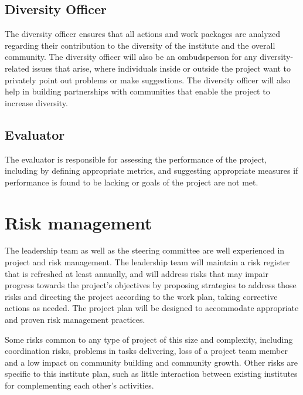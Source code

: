 \documentclass[
]{book}
\begin{document}
\hypertarget{diversity-officer}{%
\subsection{Diversity Officer}\label{diversity-officer}}

The diversity officer ensures that all actions and work packages are analyzed regarding their
contribution to the diversity of the institute and the overall community. The diversity officer will
also be an ombudsperson for any diversity-related issues that arise, where individuals inside or outside
the project want to privately point out problems or make suggestions. The diversity officer will also
help in building partnerships with communities that enable the project to increase diversity.

\hypertarget{evaluator}{%
\subsection{Evaluator}\label{evaluator}}

The evaluator is responsible for assessing the performance of the project, including by defining appropriate
metrics, and suggesting appropriate measures if performance is found to be lacking or goals of the project
are not met.

\hypertarget{risk-management}{%
\section{Risk management}\label{risk-management}}

The leadership team as well as the steering committee are well experienced in project and risk management.
The leadership team will maintain a risk register that is refreshed at least annually, and will address
risks that may impair progress towards the project's objectives by proposing strategies to address those
risks and directing the project according to the work plan, taking corrective actions as needed. The
project plan will be designed to accommodate appropriate and proven risk management practices.

Some risks common to any type of project of this size and complexity, including coordination risks,
problems in tasks delivering, loss of a project team member and a low impact on community building and
community growth. Other risks are specific to this institute plan, such as little interaction between
existing institutes for complementing each other's activities.
\end{document}
